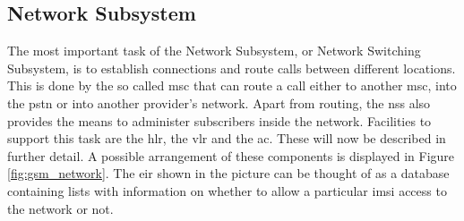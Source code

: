 \begin{table}
\centering
{}
\hspace{.5cm}
\caption{Mobile Country and Network Codes. (R) denotes that the MCC is reserved but not operational as of yet, whereas (T) denotes a operational test network.}
\label{tab:countrycodes}
\end{table}

\subsection{Network Subsystem}
\label{sec:nss}
The most important task of the Network Subsystem, or Network Switching Subsystem, is to establish connections and route calls between different locations.
This is done by the so called \gls{msc} that can route a call either to another \gls{msc}, into the \gls{pstn} or into another provider's network.
Apart from routing, the \gls{nss} also provides the means to administer subscribers inside the network.
Facilities to support this task are the \gls{hlr}, the \gls{vlr} and the \gls{ac}.
These will now be described in further detail.
A possible arrangement of these components is displayed in Figure \ref{fig:gsm_network}.
The \gls{eir} shown in the picture can be thought of as a database containing lists with information on whether to allow a particular \gls{imsi} access to the network or not.

